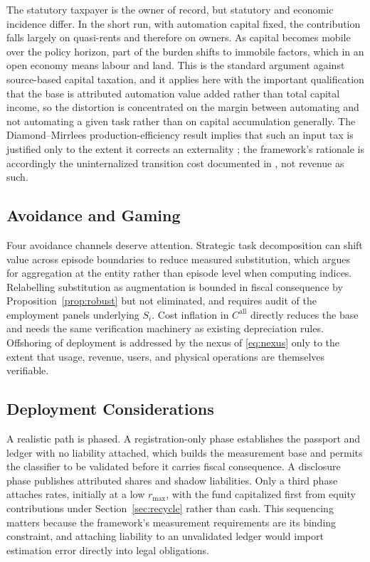 \documentclass[journal]{IEEEtran}
\theoremstyle{plain}
\theoremstyle{definition}
\begin{document}
The statutory taxpayer is the owner of record, but statutory and economic incidence differ. In the short run, with automation capital fixed, the contribution falls largely on quasi-rents and therefore on owners. As capital becomes mobile over the policy horizon, part of the burden shifts to immobile factors, which in an open economy means labour and land. This is the standard argument against source-based capital taxation, and it applies here with the important qualification that the base is attributed automation value added rather than total capital income, so the distortion is concentrated on the margin between automating and not automating a given task rather than on capital accumulation generally. The Diamond--Mirrlees production-efficiency result implies that such an input tax is justified only to the extent it corrects an externality \cite{DiamondMirrlees1971}; the framework's rationale is accordingly the uninternalized transition cost documented in \cite{InefficientAutomation}, not revenue as such.

\subsection{Avoidance and Gaming}

Four avoidance channels deserve attention. Strategic task decomposition can shift value across episode boundaries to reduce measured substitution, which argues for aggregation at the entity rather than episode level when computing indices. Relabelling substitution as augmentation is bounded in fiscal consequence by Proposition~\ref{prop:robust} but not eliminated, and requires audit of the employment panels underlying $S_i$. Cost inflation in $C^{\mathrm{all}}$ directly reduces the base and needs the same verification machinery as existing depreciation rules. Offshoring of deployment is addressed by the nexus of \eqref{eq:nexus} only to the extent that usage, revenue, users, and physical operations are themselves verifiable.

\subsection{Deployment Considerations}

A realistic path is phased. A registration-only phase establishes the passport and ledger with no liability attached, which builds the measurement base and permits the classifier to be validated before it carries fiscal consequence. A disclosure phase publishes attributed shares and shadow liabilities. Only a third phase attaches rates, initially at a low $r_{\max}$, with the fund capitalized first from equity contributions under Section~\ref{sec:recycle} rather than cash. This sequencing matters because the framework's measurement requirements are its binding constraint, and attaching liability to an unvalidated ledger would import estimation error directly into legal obligations.
\end{document}
